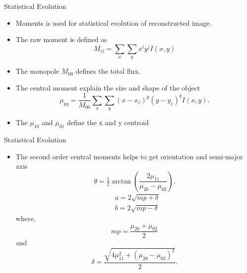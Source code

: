 \documentclass{beamer}
\begin{document}
    \begin{frame}{Statistical Evolution}
    	\begin{itemize}
    		\item Moments is used for statistical evolution of reconstructed image.
    		\item The raw moment is defined as
    		\begin{equation*}
    			M_{ij} = \sum_{x} \sum_{y} x^i y^j I(x, y)
    			\label{eqn:Mom-ij}
    		\end{equation*}
    		\item The monopole $M_{00}$ defines the total flux.
    		\item The central moment explain the size and shape of the object
    		\begin{equation*}
    			\mu_{pq} = \frac{1}{M_{00}}\sum_{x} \sum_{y} (x - x_c)^p (y - y_c)^q I(x, y).
    			\label{eqn:Central-Mom}
    		\end{equation*}
    		\item The $\mu_{10}$ and $\mu_{01}$ define the x and y centroid
    	\end{itemize}
    \end{frame}
    
    \begin{frame}{Statistical Evolution}
    	\begin{itemize}
    		\item The second order central moments helps to get orientation and semi-major axis
    		\begin{equation*}
    			\theta = \tfrac{1}{2}\arctan \left(\frac{2\mu_{11}}{\mu_{20} - \mu_{02}}\right).
    			\label{eqn:orn}
    		\end{equation*}
    		\begin{equation*}
    			\begin{aligned}
    				&a = 2\sqrt{mp + \delta} \\
    				&b = 2\sqrt{mp - \delta}
    			\end{aligned}
    			\label{eqn:semi}
    		\end{equation*}
    		where,
    		\begin{equation*}
    			mp = \frac{\mu_{20} + \mu_{02}}{2}
    			\label{eqn:mp}
    		\end{equation*}
    		and
    		\begin{equation*}
    			\delta = \frac{\sqrt{4\mu_{11}^2 + (\mu_{20} - \mu_{02})^2}}{2}.	
    			\label{eqn:delta}
    		\end{equation*}
    		
    	\end{itemize}
    \end{frame}
    
\end{document}
